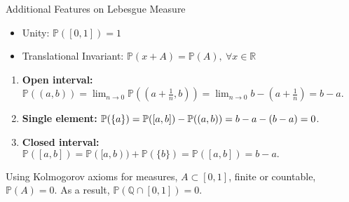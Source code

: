 \begin{prop}{Additional Features on Lebesgue Measure}
\begin{itemize}
        \item Unity: $\mathbb{P}([0, 1]) = 1$ 
    	\item Translational Invariant: $\mathbb{P}(x + A) = \mathbb{P}(A), \ \forall x \in \mathbb{R}$
\end{itemize}
\end{prop}


\begin{prop}{}
\begin{enumerate}
    \item \textbf{Open interval: } \(\mathbb{P}((a,b)) = \lim_{n \to 0} \mathbb{P}((a+\frac{1}{n},b)) = \lim_{n \to 0} b-(a+\frac{1}{n}) = b-a\).
    \item \textbf{Single element: } \(\mathbb{P}(\qty{a}) = \mathbb{P}([a,b]) - \mathbb{P}((a,b)) = b-a - (b-a) = 0 \).
    \item \textbf{Closed interval: } \(\mathbb{P}([a,b]) = \mathbb{P}([a,b)) + \mathbb{P}(\{b\}) = \mathbb{P}([a,b]) = b - a.\)
\end{enumerate}
\end{prop}

\begin{rmk}
Using Kolmogorov axioms for measures, \(A \subset [0,1]\), finite or countable, \(\mathbb{P}(A) = 0\).
As a result, \(\mathbb{P}(\mathbb{Q} \cap [0,1]) = 0.\)
\end{rmk}

